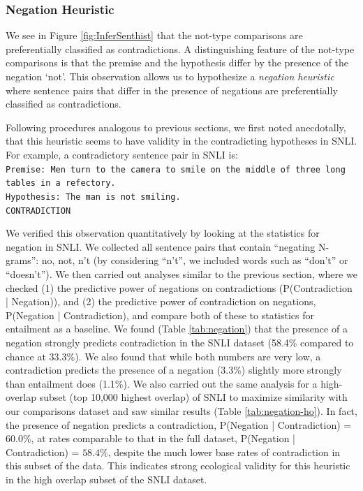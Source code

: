 \subsubsection{Negation Heuristic}
We see in Figure \ref{fig:InferSenthist} that the not-type comparisons are preferentially classified as contradictions. A distinguishing feature of the not-type comparisons is that the premise and the hypothesis differ by the presence of the negation `not'. This observation allows us to hypothesize a \textit{negation heuristic} where sentence pairs that differ in the presence of negations are preferentially classified as contradictions.

Following procedures analogous to previous sections, we first noted anecdotally, that this heuristic seems to have validity in the contradicting hypotheses in SNLI. For example, a contradictory sentence pair in SNLI is:\\
{\tt Premise: Men turn to the camera to smile on the middle of three long tables in a refectory. \\ Hypothesis:  The man is not smiling. \\ CONTRADICTION\\}

We verified this observation quantitatively by looking at the statistics for negation in SNLI. We collected all sentence pairs that contain ``negating N-grams'': no, not, n't (by considering ``n't'', we included words such as ``don't'' or ``doesn't''). We then carried out analyses similar to the previous section, where we checked (1) the predictive power of negations on contradictions (P(Contradiction | Negation)), and (2) the predictive power of contradiction on negations, P(Negation | Contradiction), and compare both of these to statistics for entailment as a baseline. We found (Table \ref{tab:negation}) that the presence of a negation strongly predicts contradiction in the SNLI dataset (58.4\% compared to chance at 33.3\%). We also found that while both numbers are very low, a contradiction predicts the presence of a negation (3.3\%) slightly more strongly than entailment does (1.1\%). We also carried out the same analysis for a high-overlap subset (top 10,000 highest overlap) of SNLI to maximize similarity with our comparisons dataset and saw similar results (Table \ref{tab:negation-ho}). In fact, the presence of negation predicts a contradiction, P(Negation | Contradiction) = $60.0\%$, at rates comparable to that in the full dataset, P(Negation | Contradiction) = $58.4\%$, despite the much lower base rates of contradiction in this subset of the data. This indicates strong ecological validity for this heuristic in the high overlap subset of the SNLI dataset.

